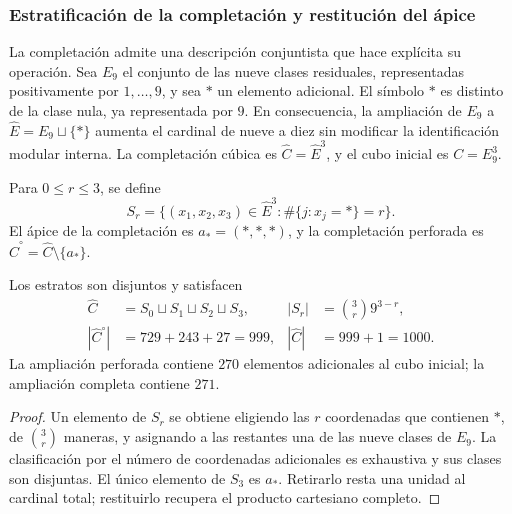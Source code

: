 \subsubsection{Estratificación de la completación y restitución del ápice}
\label{sec:revision-emrh}

La completación admite una descripción conjuntista que hace explícita su
operación. Sea \(E_9\) el conjunto de las nueve clases residuales, representadas
positivamente por \(1,\ldots,9\), y sea \(\ast\) un elemento adicional.
El símbolo \(\ast\) es distinto de la clase nula, ya representada por \(9\).
En consecuencia, la ampliación de \(E_9\) a
\(\widehat E=E_9\sqcup\{\ast\}\) aumenta el cardinal de nueve a diez
sin modificar la identificación modular interna. La completación cúbica es
\(\widehat C=\widehat E^3\), y el cubo inicial es \(C=E_9^3\).

\begin{definition}
Para \(0\leq r\leq3\), se define
\[
 S_r=\{(x_1,x_2,x_3)\in\widehat E^3:
             \#\{j:x_j=\ast\}=r\}.
\]
El ápice de la completación es \(a_\ast=(\ast,\ast,\ast)\), y la
completación perforada es \(\widehat C^{\circ}=\widehat C\setminus\{a_\ast\}\).
\end{definition}

\begin{proposition}
Los estratos son disjuntos y satisfacen
\begin{align}
 \widehat C&=S_0\sqcup S_1\sqcup S_2\sqcup S_3,
 &|S_r|&=\binom3r9^{3-r},\label{eq:revision-estratos}\\
 |\widehat C^{\circ}|&=729+243+27=999,
 &|\widehat C|&=999+1=1000.\label{eq:revision-999}
\end{align}
La ampliación perforada contiene \(270\) elementos adicionales al cubo
inicial; la ampliación completa contiene \(271\).
\end{proposition}
\begin{proof}
Un elemento de \(S_r\) se obtiene eligiendo las \(r\) coordenadas que
contienen \(\ast\), de \(\binom3r\) maneras, y asignando a las restantes
una de las nueve clases de \(E_9\). La clasificación por el número de
coordenadas adicionales es exhaustiva y sus clases son disjuntas. El único
elemento de \(S_3\) es \(a_\ast\). Retirarlo resta una unidad al cardinal
total; restituirlo recupera el producto cartesiano completo.
\end{proof}

